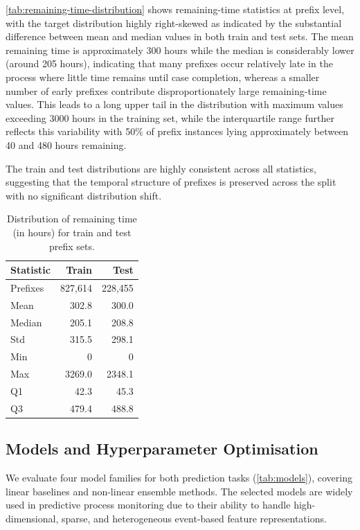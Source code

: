 \documentclass[runningheads]{llncs}
\begin{document}
\autoref{tab:remaining-time-distribution} shows remaining-time statistics at prefix level, with the target distribution highly right-skewed as indicated by the substantial difference between mean and median values in both train and test sets. The mean remaining time is approximately 300 hours while the median is considerably lower (around 205 hours), indicating that many prefixes occur relatively late in the process where little time remains until case completion, whereas a smaller number of early prefixes contribute disproportionately large remaining-time values. This leads to a long upper tail in the distribution with maximum values exceeding 3000 hours in the training set, while the interquartile range further reflects this variability with 50\% of prefix instances lying approximately between 40 and 480 hours remaining. 

The train and test distributions are highly consistent across all statistics, suggesting that the temporal structure of prefixes is preserved across the split with no significant distribution shift.

\begin{table}[H]
    \centering
    \caption{Distribution of remaining time (in hours) for train and test prefix sets.}
    \label{tab:remaining-time-distribution}
    \begin{tabular}{l r r}
        \toprule
        Statistic & Train & Test \\
        \midrule
        Prefixes & 827,614 & 228,455 \\
        Mean     & 302.8 & 300.0 \\
        Median   & 205.1 & 208.8 \\
        Std      & 315.5 & 298.1 \\
        Min      & 0   & 0 \\
        Max      & 3269.0 & 2348.1 \\
        Q1       & 42.3  & 45.3 \\
        Q3       & 479.4 & 488.8 \\
        \bottomrule
    \end{tabular}
\end{table}



\subsection{Models and Hyperparameter Optimisation}
\label{sec:model-list}

We evaluate four model families for both prediction tasks (\autoref{tab:models}),
covering linear baselines and non-linear ensemble methods. The selected models
are widely used in predictive process monitoring due to their ability to handle
high-dimensional, sparse, and heterogeneous event-based feature representations.
\end{document}
